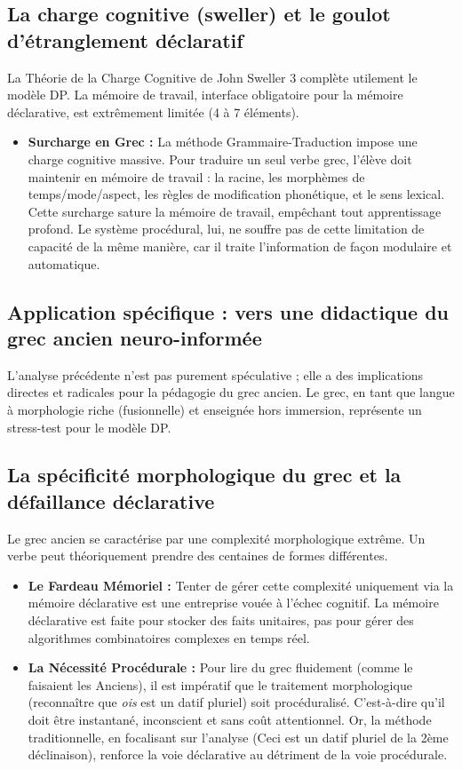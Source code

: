 \subsection{La charge cognitive (sweller) et le goulot d'étranglement déclaratif}

La Théorie de la Charge Cognitive de John Sweller 3 complète utilement le modèle DP. La mémoire de
travail, interface obligatoire pour la mémoire déclarative, est extrêmement limitée (4 à 7
éléments).

\begin{itemize}\item \textbf{Surcharge en Grec :} La méthode Grammaire-Traduction impose une charge cognitive massive. Pour traduire un seul verbe grec, l'élève doit maintenir en mémoire de travail : la racine, les morphèmes de temps/mode/aspect, les règles de modification phonétique, et le sens lexical. Cette surcharge sature la mémoire de travail, empêchant tout apprentissage profond. Le système procédural, lui, ne souffre pas de cette limitation de capacité de la même manière, car il traite l'information de façon modulaire et automatique.\end{itemize}

\subsection{Application spécifique : vers une didactique du grec ancien neuro-informée}

L'analyse précédente n'est pas purement spéculative ; elle a des implications directes et radicales
pour la pédagogie du grec ancien. Le grec, en tant que langue à morphologie riche (fusionnelle) et
enseignée hors immersion, représente un \og stress-test\fg{} pour le modèle DP.



\subsection{La spécificité morphologique du grec et la défaillance déclarative}

Le grec ancien se caractérise par une complexité morphologique extrême. Un verbe peut théoriquement
prendre des centaines de formes différentes.

\begin{itemize}\item \textbf{Le Fardeau Mémoriel :} Tenter de gérer cette complexité uniquement via la mémoire déclarative est une entreprise vouée à l'échec cognitif. La mémoire déclarative est faite pour stocker des faits unitaires, pas pour gérer des algorithmes combinatoires complexes en temps réel.\item \textbf{La Nécessité Procédurale :} Pour lire du grec fluidement (comme le faisaient les Anciens), il est impératif que le traitement morphologique (reconnaître que \textit{\-ois} est un datif pluriel) soit procéduralisé. C'est-à-dire qu'il doit être instantané, inconscient et sans coût attentionnel. Or, la méthode traditionnelle, en focalisant sur l'analyse (\og Ceci est un datif pluriel de la 2ème déclinaison\fg{}), renforce la voie déclarative au détriment de la voie procédurale.\end{itemize}

